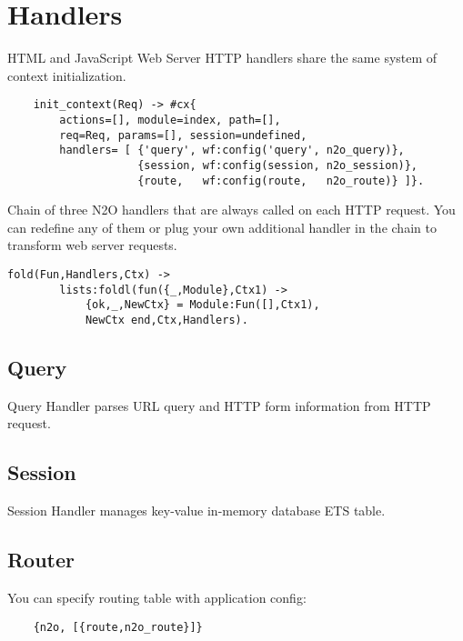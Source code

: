 
\section{Handlers}
HTML and JavaScript Web Server HTTP handlers share the same system
of context initialization.

\vspace{1\baselineskip}
\begin{lstlisting}
    init_context(Req) -> #cx{
        actions=[], module=index, path=[],
        req=Req, params=[], session=undefined,
        handlers= [ {'query', wf:config('query', n2o_query)},
                    {session, wf:config(session, n2o_session)},
                    {route,   wf:config(route,   n2o_route)} ]}.
\end{lstlisting}
\vspace{1\baselineskip}

Chain of three N2O handlers that are always called
on each HTTP request. You can redefine any of them or plug your own
additional handler in the chain to transform web server requests.

\vspace{1\baselineskip}
\begin{lstlisting}[caption=wf:fold/3]
    fold(Fun,Handlers,Ctx) ->
        lists:foldl(fun({_,Module},Ctx1) ->
            {ok,_,NewCtx} = Module:Fun([],Ctx1),
            NewCtx end,Ctx,Handlers).
\end{lstlisting}
\vspace{1\baselineskip}

\subsection{Query}
Query Handler parses URL query and HTTP form information from HTTP request.

\subsection{Session}
Session Handler manages key-value in-memory database ETS table.

\newpage
\subsection{Router}
You can specify routing table with application config:

\vspace{1\baselineskip}
\begin{lstlisting}
    {n2o, [{route,n2o_route}]}
\end{lstlisting}
\vspace{1\baselineskip}

